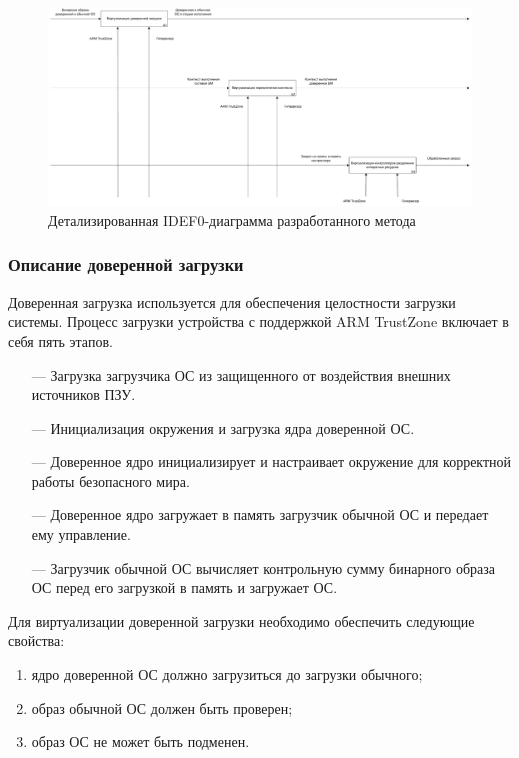 \begin{figure}[h]
	\centering
	\includegraphics[width=\textwidth]{img/main-idef0-2.pdf}
	\caption{Детализированная IDEF0-диаграмма разработанного метода}
	\label{fig:idef0-main-2}
\end{figure}

\subsubsection{Описание доверенной загрузки}

Доверенная загрузка используется для обеспечения целостности загрузки системы. Процесс загрузки устройства с поддержкой ARM TrustZone включает в себя пять этапов.

\begin{itemize}
	\item [---] Загрузка загрузчика ОС из защищенного от воздействия внешних источников ПЗУ.
	\item [---] Инициализация окружения и загрузка ядра доверенной ОС.
	\item [---] Доверенное ядро инициализирует и настраивает окружение для корректной работы безопасного мира.
	\item [---] Доверенное ядро загружает в память загрузчик обычной ОС и передает ему управление.
	\item [---] Загрузчик обычной ОС вычисляет контрольную сумму бинарного образа ОС перед его загрузкой в память и загружает ОС.
\end{itemize}

Для виртуализации доверенной загрузки необходимо обеспечить следующие свойства:

\begin{enumerate}[label*=\arabic*.]
	\item ядро доверенной ОС должно загрузиться до загрузки обычного;
	\item образ обычной ОС должен быть проверен;
	\item образ ОС не может быть подменен.
\end{enumerate}

